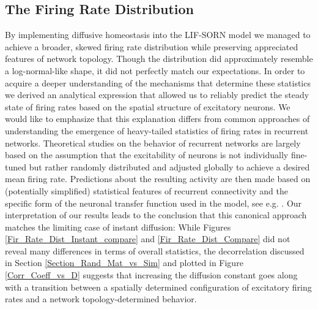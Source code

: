 \documentclass[10pt,a4paper]{article}
\begin{document}
\subsection{The Firing Rate Distribution} \label{Fir_Rate_Dist_Discussion_Section}
By implementing diffusive homeostasis into the LIF-SORN model we managed to achieve a broader, skewed firing rate distribution while preserving appreciated features of network topology. Though the distribution did approximately resemble a log-normal-like shape, it did not perfectly match our expectations. In order to acquire a deeper understanding of the mechanisms that determine these statistics we derived an analytical expression that allowed us to reliably predict the steady state of firing rates based on the spatial structure of excitatory neurons. We would like to emphasize that this explanation differs from common approaches of understanding the emergence of heavy-tailed statistics of firing rates in recurrent networks. Theoretical studies on the behavior of recurrent networks are largely based on the assumption that the excitability of neurons is not individually fine-tuned but rather randomly distributed and adjusted globally to achieve a desired mean firing rate. Predictions about the resulting activity are then made based on (potentially simplified) statistical features of recurrent connectivity and the specific form of the neuronal transfer function used in the model, see e.g. \cite{Roxin_Firing_Rate_Distribution,Vreeswijk1998}. Our interpretation of our results leads to the conclusion that this canonical approach matches the limiting case of instant diffusion: While Figures \ref{Fir_Rate_Dist_Instant_compare} and \ref{Fir_Rate_Dist_Compare} did not reveal many differences in terms of overall statistics, the decorrelation discussed in Section \ref{Section_Rand_Mat_vs_Sim} and plotted in Figure \ref{Corr_Coeff_vs_D} suggests that increasing the diffusion constant goes along with a transition between a spatially determined configuration of excitatory firing rates and a network topology-determined behavior.
\end{document}
